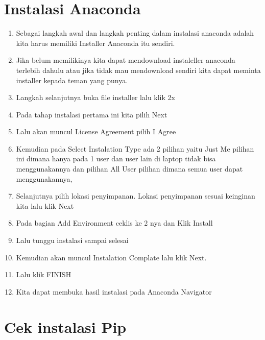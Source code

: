 \documentclass[a4paper,12pt]{report}
\begin{document}
\section{Instalasi Anaconda}
\usepackage{Berikut Langkah dalam Menginslas Anaconda:}
\begin{enumerate}
    \item Sebagai langkah awal dan langkah penting dalam instalasi anaconda adalah kita harus memiliki Installer Anaconda itu sendiri.
    \item Jika belum memilikinya kita dapat mendownload instaleller anaconda terlebih dahulu atau jika tidak mau mendownload sendiri kita dapat meminta installer kepada teman yang punya.
    \item Langkah selanjutnya buka file installer lalu klik 2x  
    \item Pada tahap instalasi pertama ini kita pilih Next
    \item Lalu akan muncul License Agreement pilih I Agree
    \item Kemudian pada Select Instalation Type ada 2 pilihan yaitu Just Me pilihan ini dimana hanya pada 1 user dan user lain di laptop tidak bisa menggunakannya dan pilihan  All User pilihan dimana semua user dapat menggunakannya, 
    \item Selanjutnya pilih lokasi penyimpanan. Lokasi penyimpanan sesuai keinginan kita lalu klik Next
    \item Pada bagian Add Environment ceklis ke 2 nya dan Klik Install
    \item Lalu tunggu instalasi sampai selesai
    \item Kemudian akan muncul Instalation Complate lalu klik Next.
    \item Lalu klik FINISH
    \item Kita dapat membuka hasil instalasi pada Anaconda Navigator
\end{enumerate}

\section{Cek instalasi Pip}
\usepackage{Untuk menecek apakah ‘pip’ telah terinstal pada laptop kita dengan cara membuka Command Prompt lalu ketik kan ”pip –version”.}
\end{document}

